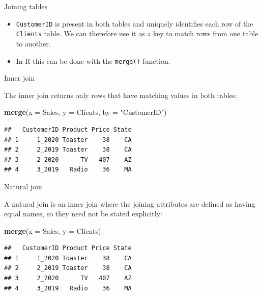 \documentclass[ignorenonframetext,]{beamer}
\newenvironment{Shaded}{\begin{snugshade}}{\end{snugshade}}
\newcommand{\DataTypeTok}[1]{\textcolor[rgb]{0.13,0.29,0.53}{#1}}
\newcommand{\KeywordTok}[1]{\textcolor[rgb]{0.13,0.29,0.53}{\textbf{#1}}}
\newcommand{\NormalTok}[1]{#1}
\newcommand{\StringTok}[1]{\textcolor[rgb]{0.31,0.60,0.02}{#1}}
\begin{document}
\begin{frame}[fragile]{Joining tables}
\protect\hypertarget{joining-tables}{}

\begin{itemize}
\item
  \texttt{CustomerID} is present in both tables and uniquely identifies
  each row of the \texttt{Clients} table. We can therefore use it as a
  key to match rows from one table to another.
\item
  In R this can be done with the \texttt{merge()} function.
\end{itemize}

\end{frame}

\begin{frame}[fragile]{Inner join}
\protect\hypertarget{inner-join}{}

The inner join returns only rows that have matching values in both
tables:

\begin{Shaded}
\begin{Highlighting}[]
\KeywordTok{merge}\NormalTok{(}\DataTypeTok{x =}\NormalTok{ Sales, }\DataTypeTok{y =}\NormalTok{ Clients,}
  \DataTypeTok{by =} \StringTok{"CustomerID"}\NormalTok{) }
\end{Highlighting}
\end{Shaded}

\begin{verbatim}
##   CustomerID Product Price State
## 1     1_2020 Toaster    38    CA
## 2     2_2019 Toaster    38    CA
## 3     2_2020      TV   407    AZ
## 4     3_2019   Radio    36    MA
\end{verbatim}

\end{frame}

\begin{frame}[fragile]{Natural join}
\protect\hypertarget{natural-join}{}

A natural join is an inner join where the joining attributes are defined
as having equal names, so they need not be stated explicitly:

\begin{Shaded}
\begin{Highlighting}[]
\KeywordTok{merge}\NormalTok{(}\DataTypeTok{x =}\NormalTok{ Sales, }\DataTypeTok{y =}\NormalTok{ Clients) }
\end{Highlighting}
\end{Shaded}

\begin{verbatim}
##   CustomerID Product Price State
## 1     1_2020 Toaster    38    CA
## 2     2_2019 Toaster    38    CA
## 3     2_2020      TV   407    AZ
## 4     3_2019   Radio    36    MA
\end{verbatim}

\end{frame}
\end{document}
